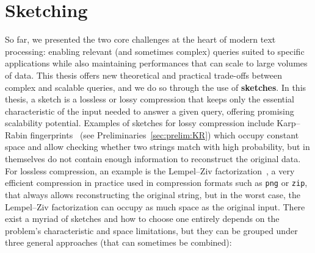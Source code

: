 \section{Sketching}\label{intro:sec:sketching}
%

So far, we presented the two core challenges at the heart of modern text processing: enabling relevant (and sometimes complex) queries suited to specific applications while also maintaining performances that can scale to large volumes of data.
%
This thesis offers new theoretical and practical trade-offs between complex and scalable queries, and we do so through the use of \textbf{sketches}.
%
In this thesis, a sketch is a lossless or lossy compression that keeps only the essential characteristic of the input needed to answer a given query, offering promising scalability potential. 
Examples of sketches for lossy compression include Karp--Rabin fingerprints~\cite{KRfingerprint} (see Preliminaries~\ref{sec:prelim:KR}) which occupy constant space and allow checking whether two strings match with high probability, but in themselves do not contain enough information to reconstruct the original data.
For lossless compression, an example is the Lempel--Ziv factorization~\cite{ziv1977universal}, a very efficient compression in practice used in compression formats such as \texttt{png} or \texttt{zip}, that always allows reconstructing the original string, but in the worst case, the Lempel--Ziv factorization can occupy as much space as the original input.
There exist a myriad of sketches and how to choose one entirely depends on the problem's characteristic and space limitations, but they can be grouped under three general approaches (that can sometimes be combined):


